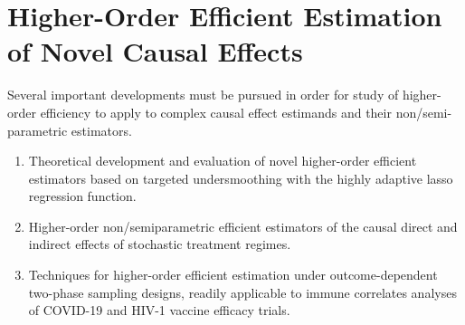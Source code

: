 \section{Higher-Order Efficient Estimation of Novel Causal Effects}

Several important developments must be pursued in order for study of
higher-order efficiency to apply to complex causal effect estimands and their
non/semi-parametric estimators.
\begin{enumerate}[label=(\alph*),topsep=0.5pt,itemsep=0pt,partopsep=1ex,parsep=1ex]
  \item Theoretical development and evaluation of novel higher-order efficient
    estimators based on targeted undersmoothing with the highly adaptive lasso
    regression function.
  \item Higher-order non/semiparametric efficient estimators of the causal
    direct and indirect effects of stochastic treatment regimes.
  \item Techniques for higher-order efficient estimation under outcome-dependent
      two-phase sampling designs, readily applicable to immune correlates
      analyses of COVID-19 and HIV-1 vaccine efficacy trials.
\end{enumerate}

